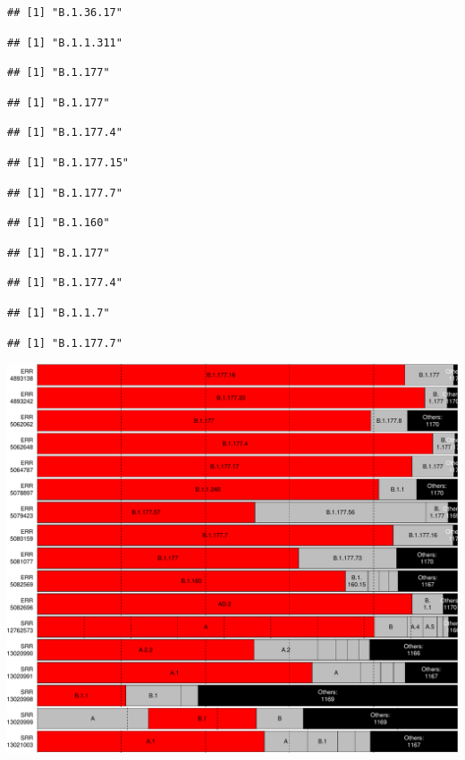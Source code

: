 \documentclass[
]{article}
\begin{document}
\begin{verbatim}
## [1] "B.1.36.17"
\end{verbatim}

\begin{verbatim}
## [1] "B.1.1.311"
\end{verbatim}

\begin{verbatim}
## [1] "B.1.177"
\end{verbatim}

\begin{verbatim}
## [1] "B.1.177"
\end{verbatim}

\begin{verbatim}
## [1] "B.1.177.4"
\end{verbatim}

\begin{verbatim}
## [1] "B.1.177.15"
\end{verbatim}

\begin{verbatim}
## [1] "B.1.177.7"
\end{verbatim}

\begin{verbatim}
## [1] "B.1.160"
\end{verbatim}

\begin{verbatim}
## [1] "B.1.177"
\end{verbatim}

\begin{verbatim}
## [1] "B.1.177.4"
\end{verbatim}

\begin{verbatim}
## [1] "B.1.1.7"
\end{verbatim}

\begin{verbatim}
## [1] "B.1.177.7"
\end{verbatim}

\includegraphics{pangolin_results_report_d_files/figure-latex/pareto-2.pdf}
\end{document}
